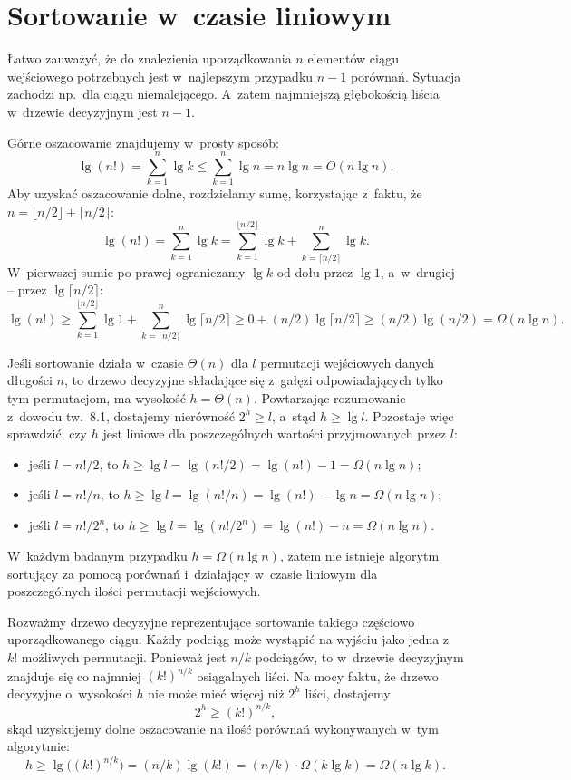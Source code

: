 \chapter{Sortowanie w~czasie liniowym}


\exercise %
Łatwo zauważyć, że do znalezienia uporządkowania $n$ elementów ciągu wejściowego potrzebnych jest w~najlepszym przypadku $n-1$ porównań. Sytuacja zachodzi np.\ dla ciągu niemalejącego. A~zatem najmniejszą głębokością liścia w~drzewie decyzyjnym jest $n-1$.

\exercise %
Górne oszacowanie znajdujemy w~prosty sposób:
\[
	\lg(n!) = \sum_{k=1}^n\lg k \le \sum_{k=1}^n\lg n = n\lg n = O(n\lg n).
\]
Aby uzyskać oszacowanie dolne, rozdzielamy sumę, korzystając z~faktu, że $n=\lfloor n/2\rfloor+\lceil n/2\rceil$:
\[
	\lg(n!) = \sum_{k=1}^n\lg k = \sum_{k=1}^{\lfloor n/2\rfloor}\lg k+\sum_{k=\lceil n/2\rceil}^n\lg k.
\]
W~pierwszej sumie po prawej ograniczamy $\lg k$ od dołu przez $\lg1$, a~w~drugiej -- przez $\lg\lceil n/2\rceil$:
\[
	\lg(n!) \ge \sum_{k=1}^{\lfloor n/2\rfloor}\lg1+\sum_{k=\lceil n/2\rceil}^n\lg\lceil n/2\rceil \ge 0+(n/2)\lg\lceil n/2\rceil \ge (n/2)\lg(n/2) = \Omega(n\lg n).
\]

\exercise %
Jeśli sortowanie działa w~czasie $\Theta(n)$ dla $l$ permutacji wejściowych danych długości $n$, to drzewo decyzyjne składające się z~gałęzi odpowiadających tylko tym permutacjom, ma wysokość $h=\Theta(n)$. Powtarzając rozumowanie z~dowodu tw.~8.1, dostajemy nierówność $2^h\ge l$, a~stąd $h\ge\lg l$. Pozostaje więc sprawdzić, czy $h$ jest liniowe dla poszczególnych wartości przyjmowanych przez $l$:
\begin{itemize}
	\item jeśli $l=n!/2$, to $h\ge\lg l=\lg(n!/2)=\lg(n!)-1=\Omega(n\lg n)$;
	\item jeśli $l=n!/n$, to $h\ge\lg l=\lg(n!/n)=\lg(n!)-\lg n=\Omega(n\lg n)$;
	\item jeśli $l=n!/2^n$, to $h\ge\lg l=\lg(n!/2^n)=\lg(n!)-n=\Omega(n\lg n)$.
\end{itemize}
W~każdym badanym przypadku $h=\Omega(n\lg n)$, zatem nie istnieje algorytm sortujący za pomocą porównań i~działający w~czasie liniowym dla poszczególnych ilości permutacji wejściowych.

\exercise %
Rozważmy drzewo decyzyjne reprezentujące sortowanie takiego częściowo uporządkowanego ciągu. Każdy podciąg może wystąpić na wyjściu jako jedna z~$k!$ możliwych permutacji. Ponieważ jest $n/k$ podciągów, to w~drzewie decyzyjnym znajduje się co najmniej $(k!)^{n/k}$ osiągalnych liści. Na mocy faktu, że drzewo decyzyjne o~wysokości $h$ nie może mieć więcej niż $2^h$ liści, dostajemy
\[
	2^h \ge (k!)^{n/k},
\]
skąd uzyskujemy dolne oszacowanie na ilość porównań wykonywanych w~tym algorytmie:
\[
	h \ge \lg\bigl((k!)^{n/k}\bigr) = (n/k)\lg(k!) = (n/k)\cdot\Omega(k\lg k) = \Omega(n\lg k).
\]

